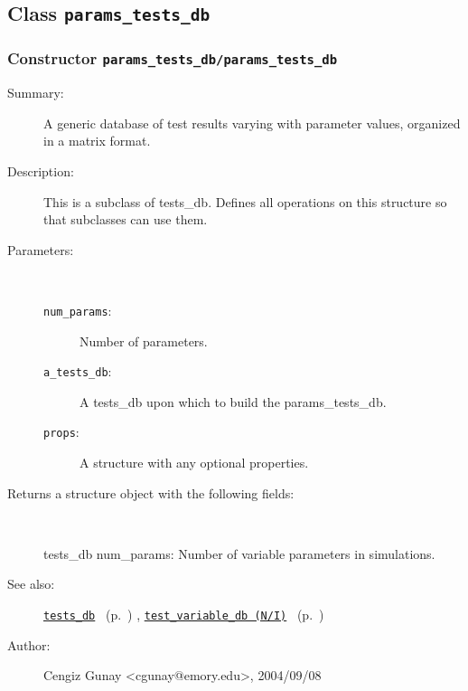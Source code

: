 \subsection{Class \texttt{params\_tests\_db}}%
%
\label{ref_params_tests_db}%
\hypertarget{ref_params_tests_db}{}%
\subsubsection[Constructor \texttt{params\_tests\_db}]{Constructor \texttt{params\_tests\_db/params\_tests\_db}}%
%
\label{ref_params_tests_db__params_tests_db}%
\hypertarget{ref_params_tests_db__params_tests_db}{}%
\begin{description}
\item[Summary:]A generic database of test results varying with parameter values, organized in a matrix format.
%
%
\item[Description:]%
This is a subclass of tests\_db. Defines all operations on this
 structure so that subclasses can use them.
\item[Parameters:]~
\begin{description}%
\item[\texttt{num\_params}:]
 Number of parameters.
\item[\texttt{a\_tests\_db}:]
 A tests\_db upon which to build the params\_tests\_db.
\item[\texttt{props}:]
 A structure with any optional properties.
\end{description}%
%
\item[Returns a structure object with the following fields:
]~

	tests\_db
	num\_params: Number of variable parameters in simulations.
%
%
\item[See also:]%
\hyperlink{ref_tests_db}{\texttt{tests\_db}}%
\ (p.~\pageref{ref_tests_db})%
%
, \hyperlink{ref_test_variable_db (N__I)}{\texttt{test\_variable\_db (N/I)}}%
\ (p.~\pageref{ref_test_variable_db (N__I)})%
%
%
\item[Author:]%
Cengiz Gunay <cgunay@emory.edu>, 2004/09/08
%
\end{description}
\methodline%
